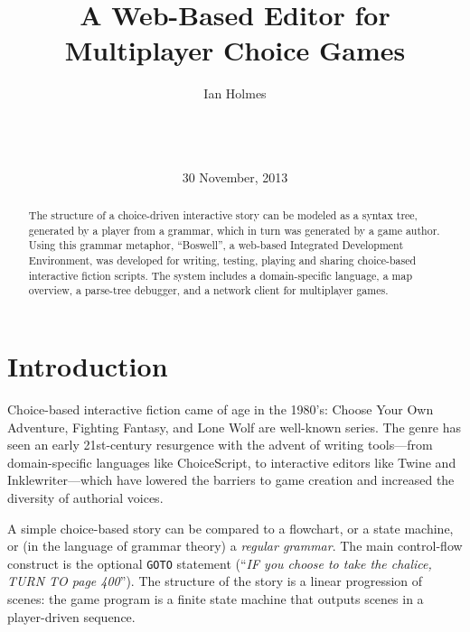 \documentclass{acm_proc_article-sp}
\begin{document}
\title{A Web-Based Editor for Multiplayer Choice Games}
\author{
\alignauthor
Ian Holmes\\
       \\
       \\
       \\
}
\date{30 November, 2013}

\maketitle
\begin{abstract}
The structure of a choice-driven interactive story can be modeled as a syntax tree, generated by a player
 from a grammar, which in turn was generated by a game author.
Using this grammar metaphor, ``Boswell'',
 a web-based Integrated Development Environment,
 was developed for writing, testing, playing and sharing choice-based interactive fiction scripts.
The system includes a domain-specific language,
 a map overview, a parse-tree debugger, and a network client for multiplayer games.
\end{abstract}



\section{Introduction}

Choice-based interactive fiction came of age in the 1980's:
Choose Your Own Adventure\cite{packard1979cave}, Fighting Fantasy\cite{jackson1982warlock},
and Lone Wolf\cite{dever1984lonewolf} are well-known series.
The genre has seen an early 21st-century resurgence with the advent of writing
tools---from domain-specific languages like ChoiceScript\cite{ChoiceScript},
to interactive editors like Twine\cite{Twine} and Inklewriter\cite{Inklewriter}---which
have lowered the barriers to game creation and increased the diversity of authorial voices.

A simple choice-based story can be compared to a flowchart, or a state machine,
or (in the language of grammar theory) a {\em regular grammar}.
The main control-flow construct is the optional {\tt GOTO} statement
(``{\em IF you choose to take the chalice, TURN TO page 400}'').
The structure of the story is a linear progression of scenes:
 the game program is a finite state machine that outputs scenes in a player-driven sequence.
\end{document}
